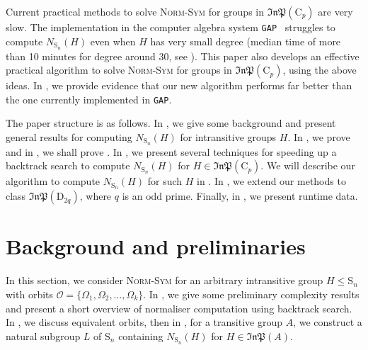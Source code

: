 \documentclass[11pt,a4paper]{article}
\theoremstyle{definition}
\theoremstyle{remark}
\newcommand{\InP}{\mathfrak{InP}}
\newcommand{\Sy}{\mathrm{S}}
\newcommand{\Cy}{\mathrm{C}}
\newcommand{\Di}{\mathrm{D}}
\begin{document}
Current practical methods to solve \textsc{Norm-Sym} for groups in $\mathfrak{InP}(\Cy_p)$ are very slow.  
The implementation in the computer algebra system \texttt{GAP}~\cite{GAP4} struggles to compute $N_{\Sy_n}(H)$ even when $H$ has very small degree (median time of more than 10 minutes for degree around 30, see ). 
This paper also develops an effective practical algorithm to solve \textsc{Norm-Sym} for groups in $\mathfrak{InP}(\Cy_p)$, using the above ideas. 
In , we provide evidence that our new algorithm performs far better than the one currently implemented in \texttt{GAP}. 


The paper structure is as follows. In , we give some background and present general results for computing $N_{\Sy_n}(H)$ for intransitive groups $H$. 
In , we prove  and in , we shall prove .
In , we present several techniques for speeding up a backtrack search to compute $N_{\Sy_n}(H)$ for $H  \in \InP(\Cy_p)$. 
We will describe our algorithm to compute $N_{\Sy_n}(H)$ for such $H$ in .
In , we extend our methods to class $\mathfrak{InP}(\Di_{2q})$, where $q$ is an odd prime.
Finally, in , we present runtime data. 




\section{Background and preliminaries}
\label{section: general normalisers}

In this section, we consider \textsc{Norm-Sym} for an arbitrary intransitive group $H \leq \Sy_n$ with orbits $\mathcal{O} = \{ \Omega_1, \Omega_2, \ldots, \Omega_k \}$. 
In , we give some preliminary complexity results and present a short overview of normaliser computation using backtrack search.
In , we discuss equivalent orbits, then in , 
for a transitive group $A$, we construct a natural subgroup $L$ of $\Sy_n$ containing $N_{\Sy_n}(H)$ for $H \in \InP(A)$.  
\end{document}
